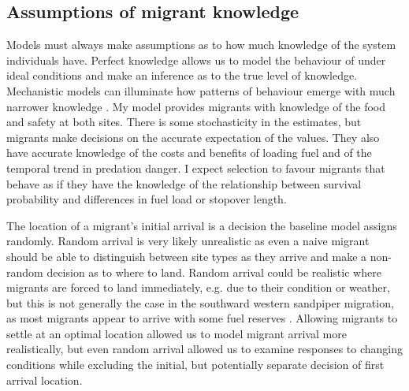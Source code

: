 \subsection*{Assumptions of migrant knowledge}

Models must always make assumptions as to how much knowledge of the system individuals have. Perfect knowledge allows us to model the behaviour of under ideal conditions and make an inference as to the true level of knowledge. Mechanistic models can illuminate how patterns of behaviour emerge with much narrower knowledge \citep{Bracis2018}. My model provides migrants with knowledge of the food and safety at both sites. There is some stochasticity in the estimates, but migrants make decisions on the accurate expectation of the values. They also have accurate knowledge of the costs and benefits of loading fuel and of the temporal trend in predation danger. I expect selection to favour migrants that behave as if they have the knowledge of the relationship between survival probability and differences in fuel load or stopover length.

The location of a migrant's initial arrival is a decision the baseline model assigns randomly. Random arrival is very likely unrealistic as even a naive migrant should be able to distinguish between site types as they arrive and make a non-random decision as to where to land. Random arrival could be realistic where migrants are forced to land immediately, e.g. due to their condition or weather, but this is not generally the case in the southward western sandpiper migration, as most migrants appear to arrive with some fuel reserves \citep{Butler1987}. Allowing migrants to settle at an optimal location allowed us to model migrant arrival more realistically, but even random arrival allowed us to examine responses to changing conditions while excluding the initial, but potentially separate decision of first arrival location.




